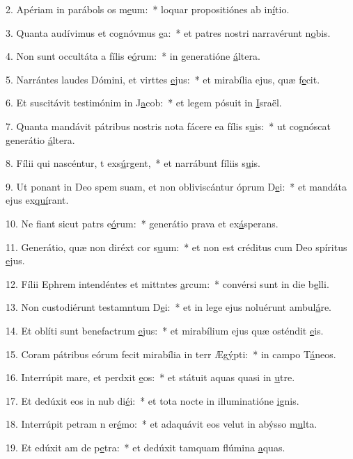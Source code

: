 2. Apériam in parábols os m\uline{e}um:~* loquar propositiónes ab in\uline{í}tio.\par 
3. Quanta audívimus et cognóvmus \uline{e}a:~* et patres nostri narravérunt n\uline{o}bis.\par 
4. Non sunt occultáta a fílis e\uline{ó}rum:~* in generatióne \uline{á}ltera.\par 
5. Narrántes laudes Dómini, et virttes \uline{e}jus:~* et mirabília ejus, quæ f\uline{e}cit.\par 
6. Et suscitávit testimónim in J\uline{a}cob:~* et legem pósuit in \uline{I}sraël.\par 
7. Quanta mandávit pátribus nostris nota fácere ea fílis s\uline{u}is:~* ut cognóscat generátio \uline{á}ltera.\par 
8. Fílii qui nascéntur, t exs\uline{ú}rgent,~* et narrábunt fíliis s\uline{u}is.\par 
9. Ut ponant in Deo spem suam, et non obliviscántur óprum D\uline{e}i:~* et mandáta ejus ex\uline{quí}rant.\par 
10. Ne fiant sicut patrs e\uline{ó}rum:~* generátio prava et ex\uline{á}sperans.\par 
11. Generátio, quæ non diréxt cor s\uline{u}um:~* et non est créditus cum Deo spíritus \uline{e}jus.\par 
12. Fílii Ephrem intendéntes et mittntes \uline{a}rcum:~* convérsi sunt in die b\uline{e}lli.\par 
13. Non custodiérunt testamntum D\uline{e}i:~* et in lege ejus noluérunt ambul\uline{á}re.\par 
14. Et oblíti sunt benefactrum \uline{e}jus:~* et mirabílium ejus quæ osténdit \uline{e}is.\par 
15. Coram pátribus eórum fecit mirabília in terr Æg\uline{ý}pti:~* in campo T\uline{á}neos.\par 
16. Interrúpit mare, et perdxit \uline{e}os:~* et státuit aquas quasi in \uline{u}tre.\par 
17. Et dedúxit eos in nub di\uline{é}i:~* et tota nocte in illuminatióne \uline{i}gnis.\par 
18. Interrúpit petram n er\uline{é}mo:~* et adaquávit eos velut in abýsso m\uline{u}lta.\par 
19. Et edúxit am de p\uline{e}tra:~* et dedúxit tamquam flúmina \uline{a}quas.\par 
